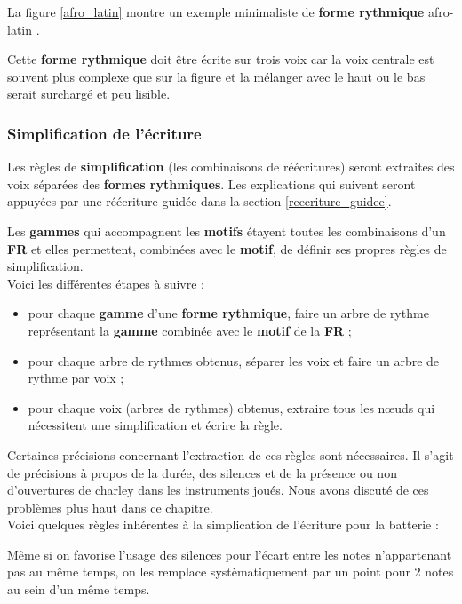 La figure \ref{afro_latin} montre un exemple minimaliste de
\textbf{forme rythmique} afro-latin \cite{system_drums}.

Cette \textbf{forme rythmique} doit être écrite sur trois voix car la voix
centrale est souvent plus complexe que sur la figure et la mélanger avec le
haut ou le bas serait surchargé et peu lisible.

\subsubsection{Simplification de l’écriture}

Les règles de \textbf{simplification} (les combinaisons de réécritures) seront
extraites des voix séparées des \textbf{formes rythmiques}.
Les explications qui suivent seront appuyées par une réécriture guidée dans la
section \ref{reecriture_guidee}.

Les \textbf{gammes} qui accompagnent les \textbf{motifs} étayent toutes les
combinaisons d’un \textbf{FR} et elles permettent, combinées avec le
\textbf{motif}, de définir ses propres règles de simplification.\\

Voici les différentes étapes à suivre :
\begin{itemize}
	\item pour chaque \textbf{gamme} d’une \textbf{forme rythmique}, faire un
        arbre de rythme représentant la \textbf{gamme} combinée avec le
        \textbf{motif} de la \textbf{FR} ;
	\item pour chaque arbre de rythmes obtenus, séparer les voix et faire un
        arbre de rythme par voix ;
	\item pour chaque voix (arbres de rythmes) obtenus, extraire tous les nœuds
        qui nécessitent une simplification et écrire la règle.\\
\end{itemize}

Certaines précisions concernant l’extraction de ces règles sont nécessaires. 
Il s’agit de précisions à propos de la durée, des silences et de la présence ou
non d’ouvertures de charley dans les instruments joués. 
Nous avons discuté de ces problèmes plus haut dans ce chapitre.\\

Voici quelques règles inhérentes à la simplication de l’écriture pour la
batterie :

Même si on favorise l’usage des silences pour l’écart entre les notes
n’appartenant pas au même temps, on les remplace systèmatiquement par un point
pour 2 notes au sein d’un même temps.

